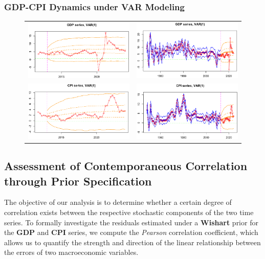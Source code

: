 \documentclass{Configuration_Files/PoliMi3i_thesis}
\begin{document}
\subsubsection{GDP-CPI Dynamics under VAR Modeling}
\begin{figure}[H]
  \centering
  \begin{tabular}{@{}cc@{}}
    \includegraphics[angle=270,width=0.35\linewidth]{VAR(1)-22.png} &
    \includegraphics[angle=270,width=0.35\linewidth]{VAR(1)-11.png} \\
    \includegraphics[angle=270,width=0.35\linewidth]{VAR(1)-44.png} &
    \includegraphics[angle=270,width=0.35\linewidth]{VAR(1)-33.png}
  \end{tabular}
\end{figure}



\subsection*{Assessment of Contemporaneous Correlation through Prior Specification}

The objective of our analysis is to determine whether a certain degree of correlation exists between the respective stochastic components of the two time series. To formally investigate the residuals estimated under a \textbf{\textbf{Wishart}} prior for the \textbf{GDP} and \textbf{CPI} series, we compute the \textit{Pearson} correlation coefficient, which allows us to quantify the strength and direction of the linear relationship between the errors of two macroeconomic variables.
\label{Prior-VAR}
\end{document}
